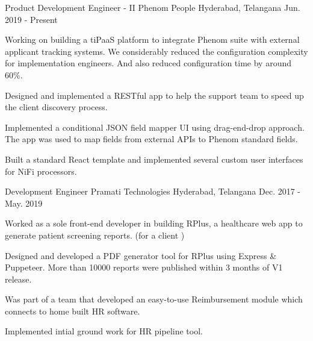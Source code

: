 

\begin{cventries}

  \cventry
  {Product Development Engineer - II} %
  {Phenom People} %
  {Hyderabad, Telangana} %
  {Jun. 2019 - Present} %
  {
    \begin{cvitems} %
      \item {Working on building a tiPaaS platform to integrate Phenom suite with external applicant tracking systems. We considerably reduced the configuration complexity for implementation engineers. And also reduced configuration time by around 60\%.}
      \item {Designed and implemented a RESTful app to help the support team to speed up the client discovery process.}
      \item {Implemented a conditional JSON field mapper UI using drag-end-drop approach. The app was used to map fields from external APIs to Phenom standard fields.}
      \item {Built a standard React template and implemented several custom user interfaces for NiFi processors.}
    \end{cvitems}
  }

  \cventry
  {Development Engineer} %
  {Pramati Technologies} %
  {Hyderabad, Telangana} %
  {Dec. 2017 - May. 2019} %
  {
    \begin{cvitems} %
      \item {Worked as a sole front-end developer in building RPlus, a healthcare web app to generate patient screening reports. (for a client )}
      \item {Designed and developed a PDF generator tool for RPlus using Express \& Puppeteer. More than 10000 reports were published within 3 months of V1 release.}
      \item {Was part of a team that developed an easy-to-use Reimbursement module which connects to home built HR software.}
      \item {Implemented intial ground work for HR pipeline tool.}
    \end{cvitems}
  }


\end{cventries}
